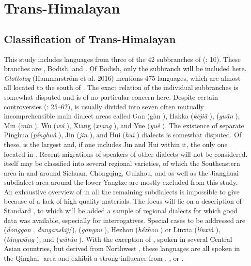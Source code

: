 \section{Trans-Himalayan}\label{sec:5.9}
\subsection{Classification of Trans-Himalayan}\label{sec:5.9.1}

This study includes languages from three of the 42 subbranches of  (\citealt{vanDriem2014}: 10). These branches are , Bodish, and . Of Bodish, only the  subbranch will be included here. \textit{Glottolog} (Hammarström et al. 2016) mentions 475  languages, which are almost all located to the south of . The exact relation of the individual subbranches is somewhat disputed and is of no particular concern here. Despite certain controversies (\citealt{Kurpaska2010}: 25–62),  is usually divided into seven often mutually incomprehensible main dialect areas called Gan (gàn ), Hakka (\textit{kèjiā} ),  (\textit{guān} ), Min (\textit{mǐn} ), Wu (\textit{wú} ), Xiang (\textit{xiāng} ), and Yue (\textit{yuè} ). The existence of separate Pinghua (\textit{pínghuà} ), Jin (\textit{jìn} ), and Hui (\textit{hu\={\i}} ) dialects is somewhat disputed. Of these,  is the largest and, if one includes Jin and Hui within it, the only one located in . Recent migrations of speakers of other dialects will not be considered.  itself may be classified into several regional varieties, of which the Southeastern area in and around Sichuan, Chongqing, Guizhou, and  as well as the Jianghuai subdialect area around the lower Yangtze are mostly excluded from this study. An exhaustive overview of  in all the remaining  subdialects is impossible to give because of a lack of high quality materials. The focus will lie on a description of Standard , to which will be added a sample of regional dialects for which good data was available, especially for interrogatives. Special cases to be addressed are  (\textit{dōnggān} , \textit{dunganskij}/),  (\textit{gāngō}\textit{u} ), Hezhou (\textit{hézhō}\textit{u} ) or Linxia (\textit{línxià} ),  (\textit{tángwāng} ), and  (\textit{wǔtún} ). With the exception of , spoken in several Central Asian countries, but derived from Northwest , these languages are all spoken in the Qinghai- area and exhibit a strong influence from , , or .

